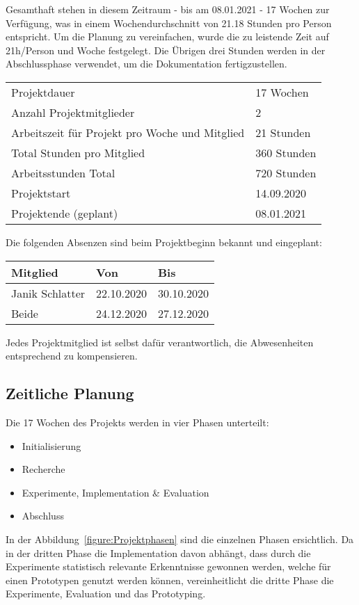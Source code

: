 Gesamthaft stehen in diesem Zeitraum - bis am 08.01.2021 - 17 Wochen zur Verfügung, 
was in einem Wochendurchschnitt von 21.18 Stunden pro Person entspricht. 
Um die Planung zu vereinfachen, wurde die zu leistende Zeit auf 21h/Person 
und Woche festgelegt. 
Die Übrigen drei Stunden werden in der Abschlussphase verwendet, 
um die Dokumentation fertigzustellen. 

\begin{table}[H]
	\centering
	\begin{tabularx}{\linewidth}{X l}
		\toprule 
		Projektdauer & 17 Wochen  \\
		Anzahl Projektmitglieder & 2 \\
		Arbeitszeit für Projekt pro Woche und Mitglied & 21 Stunden \\
		Total Stunden pro Mitglied & 360 Stunden \\
		Arbeitsstunden Total & 720 Stunden \\
		Projektstart & 14.09.2020 \\
		Projektende (geplant) & 08.01.2021 \\
		\bottomrule 
	\end{tabularx} 
\end{table}

Die folgenden Absenzen sind beim Projektbeginn bekannt und eingeplant:
\begin{table}[H]
	\centering
	\begin{tabularx}{\linewidth}{X l l}
		\toprule 
		\textbf{Mitglied} & \textbf{Von} & \textbf{Bis} \\
		\midrule
		Janik Schlatter & 22.10.2020 & 30.10.2020 \\
		Beide & 24.12.2020 & 27.12.2020 \\
		\bottomrule 
	\end{tabularx}  
\end{table}
Jedes Projektmitglied ist selbst dafür verantwortlich, 
die Abwesenheiten entsprechend zu kompensieren.

\clearpage

\subsection*{Zeitliche Planung}
Die 17 Wochen des Projekts werden in vier Phasen unterteilt: 
\begin{itemize}
	\item Initialisierung
	\item Recherche
	\item Experimente, Implementation \& Evaluation
	\item Abschluss
\end{itemize}
In der Abbildung~\ref{figure:Projektphasen} sind die einzelnen 
Phasen ersichtlich. 
Da in der dritten Phase die Implementation davon abhängt, 
dass durch die Experimente statistisch relevante Erkenntnisse gewonnen werden, 
welche für einen Prototypen genutzt werden können, 
vereinheitlicht die dritte Phase die Experimente, 
Evaluation und das Prototyping. 

